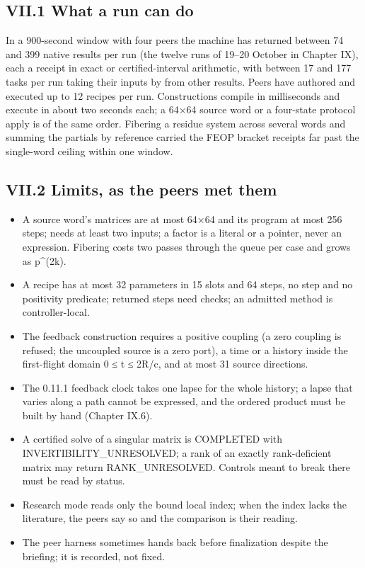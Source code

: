 \label{capabilities-limits-and-known-defects}

\subsection{VII.1 What a run can do}\label{vii.1-what-a-run-can-do}

In a 900-second window with four peers the machine has returned between 74 and 399 native results per run (the twelve runs of 19--20 October
in Chapter IX), each a receipt in exact or certified-interval arithmetic, with between 17 and 177 tasks per run taking their inputs by
 from other results. Peers have authored and executed up to 12 recipes per run. Constructions compile in milliseconds and execute in
about two seconds each; a 64×64 source word or a four-state protocol apply is of the same order. Fibering a residue system across several
words and summing the partials by reference carried the FEOP bracket receipts far past the single-word ceiling within one window.

\subsection{VII.2 Limits, as the peers met them}\label{vii.2-limits-as-the-peers-met-them}

\begin{itemize}
\tightlist
\item
  A source word's matrices are at most 64×64 and its program at most 256 steps;  needs at least two inputs; a  factor is a
  literal or a pointer, never an expression. Fibering costs two passes through the queue per case and grows as p\^{}(2k).
\item
  A recipe has at most 32 parameters in 15 slots and 64 steps, no  step and no positivity predicate; returned steps need checks; an
  admitted method is controller-local.
\item
  The feedback construction requires a positive coupling (a zero coupling is refused; the uncoupled source is a zero port), a time or a
  history inside the first-flight domain 0 ≤ t ≤ 2R/c, and at most 31 source directions.
\item
  The 0.11.1 feedback clock takes one lapse for the whole history; a lapse that varies along a path cannot be expressed, and the ordered
  product must be built by hand (Chapter IX.6).
\item
  A certified solve of a singular matrix is COMPLETED with INVERTIBILITY\_UNRESOLVED; a rank of an exactly rank-deficient matrix may return
  RANK\_UNRESOLVED. Controls meant to break there must be read by status.
\item
  Research mode reads only the bound local index; when the index lacks the literature, the peers say so and the comparison is their reading.
\item
  The peer harness sometimes hands back before finalization despite the briefing; it is recorded, not fixed.
\end{itemize}

